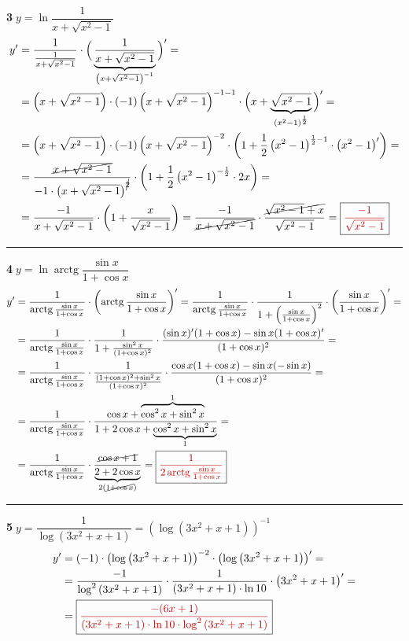 \documentclass[11pt,a4paper]{article}
\newcommand{\vysl}[1]{\boxed{\color{red!75!black}#1}}
\DeclareMathOperator{\arctg}{arctg}
\begin{document}
\textbf{\textcircled{3}}\quad $y=\ln\dfrac{1}{x+\sqrt{x^2-1}}$
\begin{align*}
y' &= \frac{1}{\frac{1}{x+\sqrt{x^2-1}}}\cdot\Big(\underbrace{\frac{1}{x+\sqrt{x^2-1}}}_{\left(x+\sqrt{x^2-1}\right)^{-1}}\Big)' =\\
&= \left(x+\sqrt{x^2-1}\right)\cdot(-1)\left(x+\sqrt{x^2-1}\right)^{-1-1}\cdot\Big(x+\underbrace{\sqrt{x^2-1}}_{\left(x^2-1\right)^{\frac12}}\Big)' =\\
&= \left(x+\sqrt{x^2-1}\right)\cdot(-1)\left(x+\sqrt{x^2-1}\right)^{-2}\cdot\left(1+\frac12\left(x^2-1\right)^{\frac12-1}\cdot\left(x^2-1\right)'\right) =\\
&= \frac{\cancel{x+\sqrt{x^2-1}}}{-1\cdot\left(x+\sqrt{x^2-1}\right)^{\cancel{2}}}\cdot\left(1+\frac12\left(x^2-1\right)^{-\frac12}\cdot2x\right) =\\
&= \frac{-1}{x+\sqrt{x^2-1}}\cdot\left(1+\frac{x}{\sqrt{x^2-1}}\right) = \frac{-1}{\cancel{x+\sqrt{x^2-1}}}\cdot\frac{\cancel{\sqrt{x^2-1}+x}}{\sqrt{x^2-1}}
= \vysl{\frac{-1}{\sqrt{x^2-1}}}
\end{align*}

\hrule
\medskip
\textbf{\textcircled{4}}\quad $y=\ln\arctg\dfrac{\sin x}{1+\cos x}$
\begin{align*}
y' &= \frac{1}{\arctg\frac{\sin x}{1+\cos x}}\cdot\left(\arctg\frac{\sin x}{1+\cos x}\right)' =
\frac{1}{\arctg\frac{\sin x}{1+\cos x}}\cdot\frac{1}{1+\left(\frac{\sin x}{1+\cos x}\right)^2}\cdot\left(\frac{\sin x}{1+\cos x}\right)' =\\
&= \frac{1}{\arctg\frac{\sin x}{1+\cos x}}\cdot\frac{1}{1+\frac{\sin^2x}{(1+\cos x)^2}}\cdot\frac{(\sin x)'(1+\cos x)-\sin x(1+\cos x)'}{(1+\cos x)^2} =\\
&= \frac{1}{\arctg\frac{\sin x}{1+\cos x}}\cdot\frac{1}{\frac{(1+\cos x)^2+\sin^2x}{(1+\cos x)^2}}\cdot\frac{\cos x(1+\cos x)-\sin x(-\sin x)}{(1+\cos x)^2} =\\
&= \frac{1}{\arctg\frac{\sin x}{1+\cos x}}\cdot\frac{\cos x+\overbrace{\cos^2x+\sin^2x}^{1}}{1+2\cos x+\underbrace{\cos^2x+\sin^2x}_{1}} =\\
&= \frac{1}{\arctg\frac{\sin x}{1+\cos x}}\cdot\frac{\cancel{\cos x+1}}{\underbrace{2+2\cos x}_{2(\cancel{1+\cos x})}}
= \vysl{\frac{1}{2\arctg\frac{\sin x}{1+\cos x}}}
\end{align*}

\hrule
\medskip
\textbf{\textcircled{5}}\quad $y=\dfrac{1}{\log\left(3x^2+x+1\right)}=\left(\log\left(3x^2+x+1\right)\right)^{-1}$
\begin{align*}
y' &= (-1)\cdot\left(\log\left(3x^2+x+1\right)\right)^{-2}\cdot\left(\log\left(3x^2+x+1\right)\right)' =\\
&= \frac{-1}{\log^2\left(3x^2+x+1\right)}\cdot\frac{1}{\left(3x^2+x+1\right)\cdot\ln10}\cdot\left(3x^2+x+1\right)' =\\
&= \vysl{\frac{-(6x+1)}{\left(3x^2+x+1\right)\cdot\ln10\cdot\log^2\left(3x^2+x+1\right)}}
\end{align*}
\end{document}
